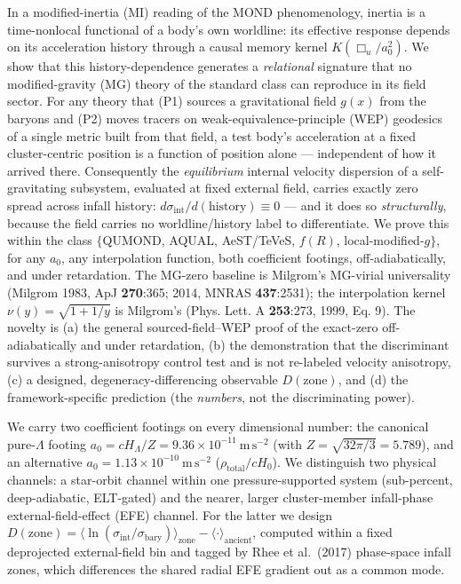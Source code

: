 \documentclass[
]{article}
\begin{document}
In a modified-inertia (MI) reading of the MOND phenomenology, inertia is
a time-nonlocal functional of a body's own worldline: its effective
response depends on its acceleration history through a causal memory
kernel \(K(\Box_u/a_0^2)\). We show that this history-dependence
generates a \emph{relational} signature that no modified-gravity (MG)
theory of the standard class can reproduce in its field sector. For any
theory that (P1) sources a gravitational field \(g(x)\) from the baryons
and (P2) moves tracers on weak-equivalence-principle (WEP) geodesics of
a single metric built from that field, a test body's acceleration at a
fixed cluster-centric position is a function of position alone ---
independent of how it arrived there. Consequently the \emph{equilibrium}
internal velocity dispersion of a self-gravitating subsystem, evaluated
at fixed external field, carries exactly zero spread across infall
history: \(d\sigma_\mathrm{int}/d(\text{history}) \equiv 0\) --- and it
does so \emph{structurally}, because the field carries no
worldline/history label to differentiate. We prove this within the class
\(\{\)QUMOND, AQUAL, AeST/TeVeS, \(f(R)\), local-modified-\(g\}\), for
any \(a_0\), any interpolation function, both coefficient footings,
off-adiabatically, and under retardation. The MG-zero baseline is
Milgrom's MG-virial universality (Milgrom 1983, ApJ \textbf{270}:365;
2014, MNRAS \textbf{437}:2531); the interpolation kernel
\(\nu(y)=\sqrt{1+1/y}\) is Milgrom's (Phys. Lett. A \textbf{253}:273,
1999, Eq. 9). The novelty is (a) the general sourced-field--WEP proof of
the exact-zero off-adiabatically and under retardation, (b) the
demonstration that the discriminant survives a strong-anisotropy control
test and is not re-labeled velocity anisotropy, (c) a designed,
degeneracy-differencing observable \(D(\text{zone})\), and (d) the
framework-specific prediction (the \emph{numbers}, not the
discriminating power).

We carry two coefficient footings on every dimensional number: the
canonical pure-\(\Lambda\) footing
\(a_0=cH_\Lambda/Z=9.36\times10^{-11}\ \mathrm{m\,s^{-2}}\) (with
\(Z=\sqrt{32\pi/3}=5.789\)), and an alternative
\(a_0=1.13\times10^{-10}\ \mathrm{m\,s^{-2}}\)
(\(\rho_\mathrm{total}/cH_0\)). We distinguish two physical channels: a
star-orbit channel within one pressure-supported system (sub-percent,
deep-adiabatic, ELT-gated) and the nearer, larger cluster-member
infall-phase external-field-effect (EFE) channel. For the latter we
design
\(D(\text{zone})=\langle\ln(\sigma_\mathrm{int}/\sigma_\mathrm{bary})\rangle_\mathrm{zone}-\langle\cdot\rangle_\mathrm{ancient}\),
computed within a fixed deprojected external-field bin and tagged by
Rhee et al.~(2017) phase-space infall zones, which differences the
shared radial EFE gradient out as a common mode.
\end{document}
